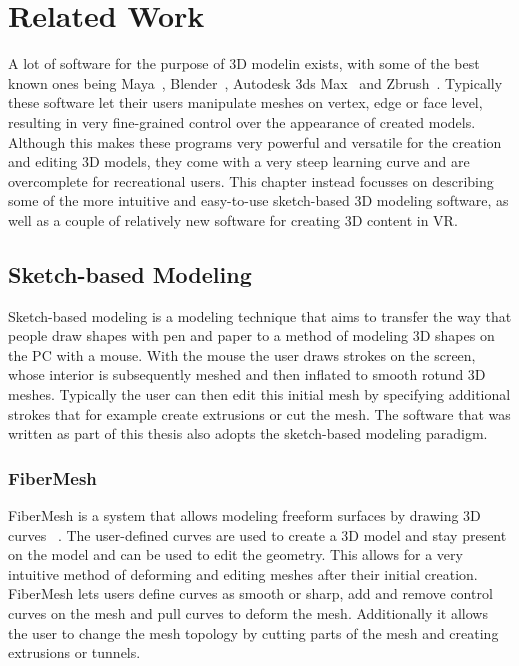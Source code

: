 
\chapter{Related Work}
\label{chap:related}
A lot of software for the purpose of 3D modelin exists, with some of the best known ones being Maya~\cite{Maya}, Blender~\cite{Blender}, Autodesk 3ds Max~\cite{3dsMAX} and Zbrush~\cite{ZBrush}. Typically these software let their users manipulate meshes on vertex, edge or face level, resulting in very fine-grained control over the appearance of created models. Although this makes these programs very powerful and versatile for the creation and editing 3D models, they come with a very steep learning curve and are overcomplete for recreational users. This chapter instead focusses on describing some of the more intuitive and easy-to-use sketch-based 3D modeling software, as well as a couple of relatively new software for creating 3D content in VR. 

\section{Sketch-based Modeling}
Sketch-based modeling is a modeling technique that aims to transfer the way that people draw shapes with pen and paper to a method of modeling 3D shapes on the PC with a mouse. With the mouse the user draws strokes on the screen, whose interior is subsequently meshed and then inflated to smooth rotund 3D meshes. Typically the user can then edit this initial mesh by specifying additional strokes that for example create extrusions or cut the mesh.
The software that was written as part of this thesis also adopts the sketch-based modeling paradigm. 


\subsection{FiberMesh}
\label{subsec:fiber}
FiberMesh is a system that allows modeling freeform surfaces by drawing 3D curves ~\cite{Nealen2007}. The user-defined curves are used to create a 3D model and stay present on the model and can be used to edit the geometry. This allows for a very intuitive method of deforming and editing meshes after their initial creation. FiberMesh lets users define curves as smooth or sharp, add and remove control curves on the mesh and pull curves to deform the mesh. Additionally it allows the user to change the mesh topology by cutting parts of the mesh and creating extrusions or tunnels.

